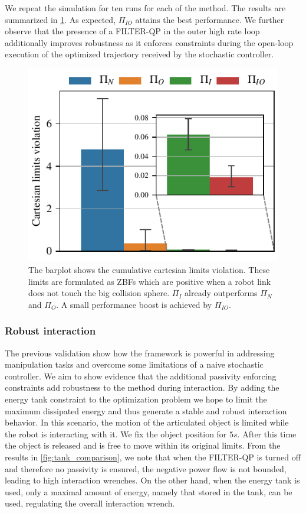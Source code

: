 We repeat the simulation for ten runs for each of the method. The results are summarized in \fig \ref{fig:obstacle_avoidance}. As expected, $\Pi_{IO}$ attains the best performance. We further observe that the presence of a FILTER-QP in the outer high rate loop additionally improves robustness as it enforces constraints during the open-loop execution of the optimized trajectory received by the stochastic controller. 
\begin{figure}[t]
    \centering
    \includegraphics[width=0.7\columnwidth]{figures/obstacle_avoidance/obstacle_avoidance_test.pdf}
    \caption{The barplot shows the cumulative cartesian limits violation. These limits are formulated as ZBFs which are positive when a robot link does not touch the big collision sphere. $\Pi_{I}$ already outperforms $\Pi_{N}$ and $\Pi_{O}$. A small performance boost is achieved by $\Pi_{IO}$.}
    \label{fig:obstacle_avoidance}
\end{figure}

\vspace{0.5cm}
\subsubsection{Robust interaction}
The previous validation show how the framework is powerful in addressing manipulation tasks and overcome some limitations of a naive stochastic controller. We aim to show evidence that the additional passivity enforcing constraints add robustness to the method during interaction. By adding the energy tank constraint to the optimization problem we hope to limit the maximum dissipated energy and thus generate a stable and robust interaction behavior. In this scenario, the motion of the articulated object is limited while the robot is interacting with it. We fix the object position for $5s$. After this time the object is released and is free to move within its original limits. From the results in \fig\ref{fig:tank_comparison}, we note that when the FILTER-QP is turned off and therefore no passivity is ensured, the negative power flow is not bounded, leading to high interaction wrenches. On the other hand, when the energy tank is used, only a maximal amount of energy, namely that stored in the tank, can be used, regulating the overall interaction wrench.

